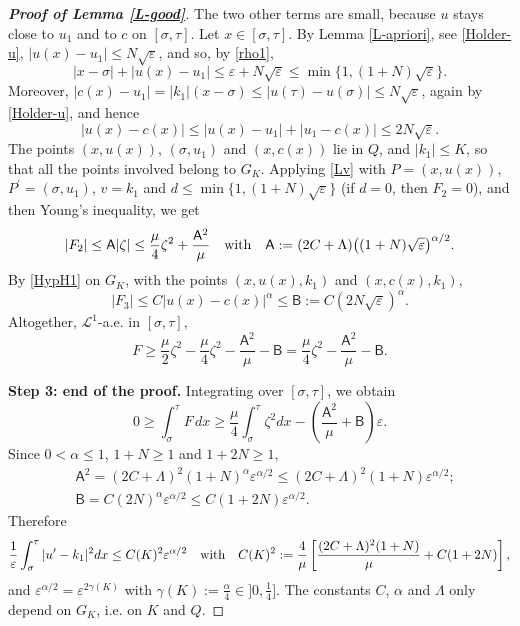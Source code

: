 \documentclass[reqno,12pt]{amsart}
\numberwithin{equation}{section}
\def\eps{\varepsilon}
\theoremstyle{remark}
\begin{document}
\begin{proof}[\bf Proof of Lemma \ref{L-good}]
The two other terms are small, because $u$ stays close to $u_1$ and to $c$ on $[\sigma,\tau]$. Let $x\in[\sigma,\tau]$. By Lemma \ref{L-apriori}, see \eqref{Holder-u}, $|u(x)-u_1|\leq N\sqrt\eps$, and so, by \eqref{rho1},
\begin{equation*}
|x-\sigma|+|u(x)-u_1|\leq\eps+N\sqrt\eps\leq\min\big\{1,(1+N)\sqrt\eps\big\}.
\end{equation*}
Moreover, $|c(x)-u_1|=|k_1|(x-\sigma)\leq|u(\tau)-u(\sigma)|\leq N\sqrt\eps$, again by \eqref{Holder-u}, and hence
\begin{equation*}
|u(x)-c(x)|\leq|u(x)-u_1|+|u_1-c(x)|\leq2N\sqrt\eps.
\end{equation*}
The points $(x,u(x))$, $(\sigma,u_1)$ and $(x,c(x))$ lie in $Q$, and $|k_1|\leq K$, so that all the points involved belong to $G_K$. Applying \eqref{Lv} with $P=(x,u(x))$, $P^\prime=(\sigma,u_1)$, $v=k_1$ and $d\leq\min\{1,(1+N)\sqrt\eps\}$ (if $d=0$, then $F_2=0$), and then Young's inequality, we get
\begin{equation*}
|F_2|\leq\mathsf{A}|\zeta|\leq\frac\mu4\zeta^2+\frac{\mathsf{A}^2}{\mu}\quad\hbox{with}\quad\mathsf{A}:=(2C+\Lambda)\big((1+N)\sqrt\eps\big)^{\alpha/2}.
\end{equation*}
By \ref{HypH1} on $G_K$, with the points $(x,u(x),k_1)$ and $(x,c(x),k_1)$,
\begin{equation*}
|F_3|\leq C|u(x)-c(x)|^\alpha\leq\mathsf{B}:=C(2N\sqrt\eps)^\alpha.
\end{equation*}
Altogether, $\mathcal{L}^1$-a.e. in $[\sigma,\tau]$,
\begin{equation*}
F\geq\frac\mu2\zeta^2-\frac\mu4\zeta^2-\frac{\mathsf A^2}\mu-\mathsf B=\frac\mu4\zeta^2-\frac{\mathsf{A}^2}{\mu}-\mathsf{B}.
\end{equation*}

\medskip

{\bf Step 3: end of the proof.} Integrating over $[\sigma,\tau]$, we obtain
\begin{equation*}
0\geq\int_\sigma^\tau F\,dx\geq\frac\mu4\int_\sigma^\tau\zeta^2dx-\left(\frac{\mathsf A^2}\mu+\mathsf B\right)\eps.
\end{equation*}
Since $0<\alpha\leq1$, $1+N\geq1$ and $1+2N\geq1$,
\begin{align*}
&\mathsf A^2=(2C+\Lambda)^2(1+N)^\alpha\eps^{\alpha/2}\leq(2C+\Lambda)^2(1+N)\eps^{\alpha/2};\\
&\mathsf B=C(2N)^\alpha\eps^{\alpha/2}\leq C(1+2N)\eps^{\alpha/2}.
\end{align*}
Therefore
\begin{equation*}
\frac1\eps\int_\sigma^\tau|u^\prime-k_1|^2dx\leq C(K)^2\eps^{\alpha/2}\quad\hbox{with}\quad C(K)^2:=\frac4\mu\left[\frac{(2C+\Lambda)^2(1+N)}{\mu}+C(1+2N)\right],
\end{equation*}
and $\eps^{\alpha/2}=\eps^{2\gamma(K)}$ with $\gamma(K):=\frac\alpha4\in]0,\frac14]$. The constants $C$, $\alpha$ and $\Lambda$ only depend on $G_K$, i.e. on $K$ and $Q$.
\end{proof}
\end{document}

